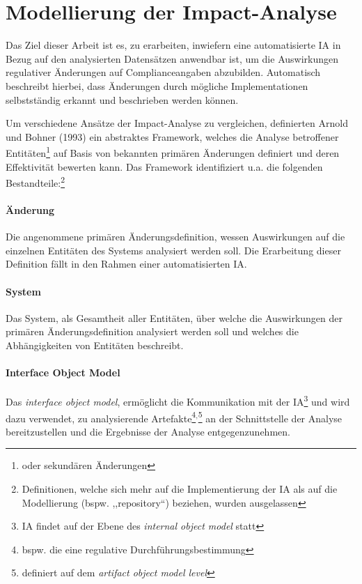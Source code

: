 \pagebreak
\section{Modellierung der Impact-Analyse}
\label{model_ia}

Das Ziel dieser Arbeit ist es, zu erarbeiten, inwiefern eine automatisierte \acf{IA} in Bezug auf den analysierten Datensätzen anwendbar ist, um die Auswirkungen regulativer Änderungen auf Complianceangaben abzubilden.
Automatisch beschreibt hierbei, dass Änderungen durch mögliche Implementationen selbstständig erkannt und beschrieben werden können.

\medskip
Um verschiedene Ansätze der Impact-Analyse zu vergleichen, definierten Arnold und Bohner (1993) \cite{app_bohner} ein abstraktes Framework, welches die Analyse betroffener Entitäten\footnote{oder sekundären Änderungen} auf Basis von bekannten primären Änderungen definiert und deren Effektivität bewerten kann.
\cite[22]{app_lindvall}
Das Framework identifiziert u.a. die folgenden Bestandteile:\footnote{Definitionen, welche sich mehr auf die Implementierung der \ac{IA} als auf die Modellierung (bspw. ,,repository``) beziehen, wurden ausgelassen}

\paragraph{Änderung}
    Die angenommene primären Änderungsdefinition,\hspace{1pt} wessen Auswirkungen auf die einzelnen Entitäten des Systems analysiert werden soll.
    Die Erarbeitung dieser Definition fällt in den Rahmen einer automatisierten \ac{IA}. 

\paragraph{System}
    Das System, als Gesamtheit aller Entitäten, über welche die Auswirkungen der primären Änderungsdefinition analysiert werden soll und welches die Abhängigkeiten von Entitäten beschreibt.

\paragraph{Interface Object Model}
    Das \textit{interface object model}, ermöglicht die Kommunikation mit der \ac{IA}\footnote{\ac{IA} findet auf der Ebene des \textit{internal object model} statt} und wird dazu verwendet, zu analysierende Artefakte\footnote{bspw. die eine regulative Durchführungsbestimmung}$^,$\footnote{definiert auf dem \textit{artifact object model level}} an der Schnittstelle der Analyse bereitzustellen und die Ergebnisse der Analyse entgegenzunehmen.  

